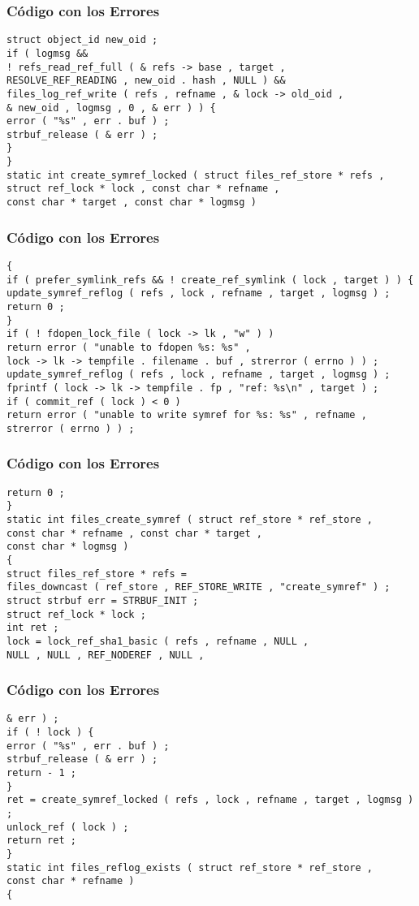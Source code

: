 \documentclass{beamer}
\begin{document}
\begin{frame}[fragile]
\frametitle{C\'odigo con los Errores}
\begin{verbatim}
struct object_id new_oid ; 
if ( logmsg && 
! refs_read_ref_full ( & refs -> base , target , 
RESOLVE_REF_READING , new_oid . hash , NULL ) && 
files_log_ref_write ( refs , refname , & lock -> old_oid , 
& new_oid , logmsg , 0 , & err ) ) { 
error ( "%s" , err . buf ) ; 
strbuf_release ( & err ) ; 
} 
} 
static int create_symref_locked ( struct files_ref_store * refs , 
struct ref_lock * lock , const char * refname , 
const char * target , const char * logmsg ) 
\end{verbatim}
\end{frame}
\begin{frame}[fragile]
\frametitle{C\'odigo con los Errores}
\begin{verbatim}
{ 
if ( prefer_symlink_refs && ! create_ref_symlink ( lock , target ) ) { 
update_symref_reflog ( refs , lock , refname , target , logmsg ) ; 
return 0 ; 
} 
if ( ! fdopen_lock_file ( lock -> lk , "w" ) ) 
return error ( "unable to fdopen %s: %s" , 
lock -> lk -> tempfile . filename . buf , strerror ( errno ) ) ; 
update_symref_reflog ( refs , lock , refname , target , logmsg ) ; 
fprintf ( lock -> lk -> tempfile . fp , "ref: %s\n" , target ) ; 
if ( commit_ref ( lock ) < 0 ) 
return error ( "unable to write symref for %s: %s" , refname , 
strerror ( errno ) ) ; 
\end{verbatim}
\end{frame}
\begin{frame}[fragile]
\frametitle{C\'odigo con los Errores}
\begin{verbatim}
return 0 ; 
} 
static int files_create_symref ( struct ref_store * ref_store , 
const char * refname , const char * target , 
const char * logmsg ) 
{ 
struct files_ref_store * refs = 
files_downcast ( ref_store , REF_STORE_WRITE , "create_symref" ) ; 
struct strbuf err = STRBUF_INIT ; 
struct ref_lock * lock ; 
int ret ; 
lock = lock_ref_sha1_basic ( refs , refname , NULL , 
NULL , NULL , REF_NODEREF , NULL , 
\end{verbatim}
\end{frame}
\begin{frame}[fragile]
\frametitle{C\'odigo con los Errores}
\begin{verbatim}
& err ) ; 
if ( ! lock ) { 
error ( "%s" , err . buf ) ; 
strbuf_release ( & err ) ; 
return - 1 ; 
} 
ret = create_symref_locked ( refs , lock , refname , target , logmsg ) ; 
unlock_ref ( lock ) ; 
return ret ; 
} 
static int files_reflog_exists ( struct ref_store * ref_store , 
const char * refname ) 
{ 
\end{verbatim}
\end{frame}
\end{document}
